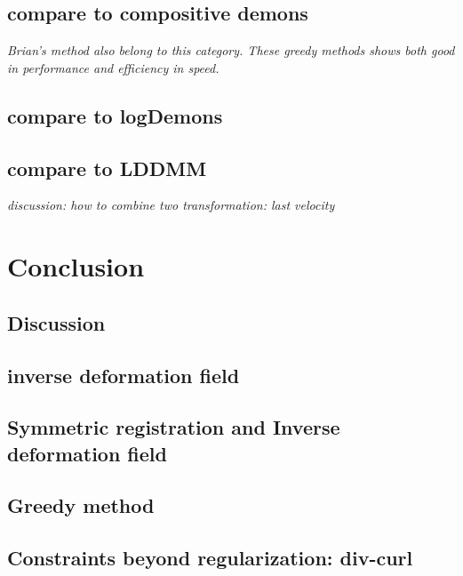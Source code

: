 \documentclass[letterpaper,12pt]{article}
\begin{document}
\subsection{compare to compositive demons}
\textit{Brian's method also belong to this category. These greedy methods shows both good in performance and efficiency in speed.}

\subsection{compare to logDemons}
\subsection{compare to LDDMM}
\textit{discussion: how to combine two transformation: last velocity }

 

\section{Conclusion}

\subsection{Discussion}

\subsection{inverse deformation field}
\subsection{Symmetric registration and Inverse deformation field}
\subsection{Greedy method}
\subsection{Constraints beyond regularization: div-curl}














\end{document}
